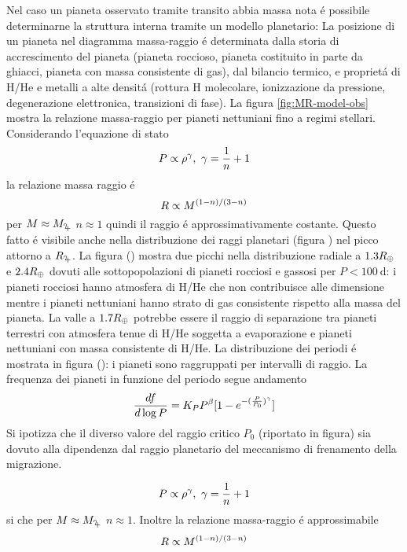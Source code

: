 Nel caso un pianeta osservato tramite transito abbia massa nota \'e possibile determinarne la struttura interna tramite un modello planetario: La posizione di un pianeta nel diagramma massa-raggio \'e determinata dalla storia di accrescimento del pianeta (pianeta roccioso, pianeta costituito in parte da ghiacci, pianeta con massa consistente di gas), dal bilancio termico, e propriet\'a di H/He e metalli a alte densit\'a (rottura H molecolare, ionizzazione da pressione, degenerazione elettronica, transizioni di fase). La figura \ref{fig:MR-model-obs} mostra la relazione massa-raggio per pianeti nettuniani fino a regimi stellari. Considerando l'equazione di stato
\begin{equation}
P\propto\rho\expy{\gamma},\ \gamma=\frac{1}{n}+1
\end{equation}
la relazione massa raggio \'e
\begin{equation}
R\propto M\expy{(1-n)/(3-n)}
\end{equation}
per $M\approx\mjupiter$ $n\approx1$ quindi il raggio \'e approssimativamente costante. Questo fatto \'e visibile anche nella distribuzione dei raggi planetari (figura ) nel picco attorno a $\rjupiter$.
La figura () mostra due picchi nella distribuzione radiale a $1.3\rearth{}$ e $2.4\rearth{}$ dovuti alle sottopopolazioni di pianeti rocciosi e gassosi per $P<\SI{100}{\day}$: i pianeti rocciosi hanno atmosfera di H/He che non contribuisce alle dimensione mentre i pianeti nettuniani hanno strato di gas consistente rispetto alla massa del pianeta. La valle a $1.7\rearth{}$ potrebbe essere il raggio di separazione tra pianeti terrestri con atmosfera tenue di H/He soggetta a evaporazione e pianeti nettuniani con massa consistente di H/He.
La distribuzione dei periodi \'e mostrata in figura (): i pianeti sono raggruppati per intervalli di raggio. La frequenza dei pianeti in funzione del periodo segue andamento
\begin{equation}
\TDy{\log{P}}{f}=K_PP\expy{\beta}[1-\exp{-(\frac{P}{P_0})\expy{\gamma}}]
\end{equation}
Si ipotizza che il diverso valore del raggio critico $P_0$ (riportato in figura) sia dovuto alla dipendenza dal raggio planetario del meccanismo di frenamento della migrazione.

\begin{errata}
\begin{equation}
P\propto\rho\expy{\gamma},\ \gamma=\frac{1}{n}+1
\end{equation}
si che per $M\approx\mjupiter$ $n\approx1$.
Inoltre la relazione massa-raggio  \'e approssimabile
\begin{equation}
R\propto M\expy{(1-n)/(3-n)}
\end{equation}
\end{errata}


